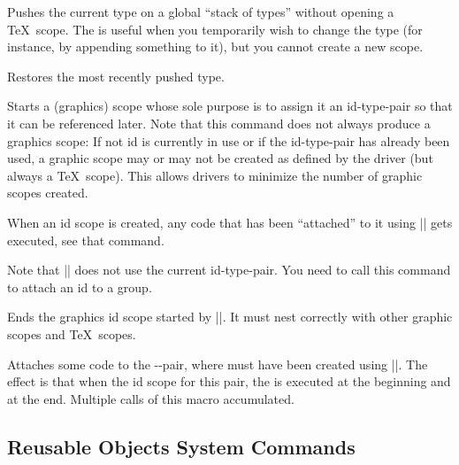 \begin{command}{\pgfsys@push@type}
  Pushes the current type on a global ``stack of types'' without
  opening a \TeX\ scope. The is useful when you temporarily wish to
  change the type (for instance, by appending something to it), but
  you cannot create a new scope.
\end{command}

\begin{command}{\pgfsys@pop@type}
  Restores the most recently pushed type.
\end{command}

\begin{command}{\pgfsys@begin@idscope}
  Starts a (graphics) scope whose sole purpose is to assign it an
  id-type-pair so that it can be referenced later. Note that this
  command does not always produce a graphics scope: If not id is
  currently in use or if the id-type-pair has already been used,
  a graphic scope may or may not be created as defined by the driver
  (but always a \TeX\ scope). This allows drivers to minimize the
  number of graphic scopes created.

  When an id scope is created, any code that has been ``attached'' to
  it using |\pgfsys@attach@to@id| gets executed, see that command.

  Note that |\pgfsys@beginscope| does not use the current
  id-type-pair. You need to call this command to attach an id to a
  group. 
\end{command}

\begin{command}{\pgfsys@end@idscope}
  Ends the graphics id scope started by |\pgfsys@end@idscope|. It must
  nest correctly with other graphic scopes and \TeX\ scopes.
\end{command}


\begin{command}{\pgfsys@attach@to@id{}}
  Attaches some code to the --pair, where
   must have been created using |\pgfsys@new@id|. The effect
  is that when the id scope for this pair, the  is
  executed at the beginning and  at the end. Multiple
  calls of this macro accumulated.
\end{command}


\subsection{Reusable Objects System Commands}


